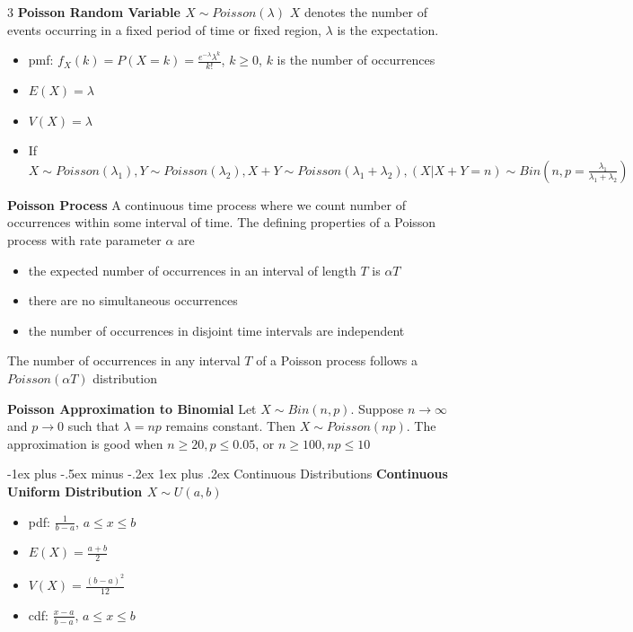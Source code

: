 \documentclass[10pt, landscape]{article}
\makeatletter
\renewcommand{\subsection}{\@startsection{subsection}{3}{0mm}%
                                {-1ex plus -.5ex minus -.2ex}%
                                {1ex plus .2ex}%
                                {\normalfont\small\bfseries}}%
\makeatother
\begin{document}
\begin{multicols*}{3}
\textbf{Poisson Random Variable $X \sim Poisson(\lambda)$} $X$ denotes the number of events occurring in a fixed period of time or fixed region, $\lambda$ is the expectation.
\begin{itemize}
    \item pmf: $f_X(k)=P(X=k)=\frac{e^{-\lambda}\lambda^k}{k!}$, $k \geq 0$, $k$ is the number of occurrences
    \item $E(X)=\lambda$
    \item $V(X)=\lambda$
    \item If $X \sim Poisson(\lambda_1), Y \sim Poisson(\lambda_2), X+Y \sim Poisson(\lambda_1+\lambda_2), (X | X+Y=n) \sim Bin(n, p=\frac{\lambda_1}{\lambda_1+\lambda_2})$
\end{itemize}

\textbf{Poisson Process} A continuous time process where we count number of occurrences within some interval of time. The defining properties of a Poisson process with rate parameter $\alpha$ are
\begin{itemize}
    \item the expected number of occurrences in an interval of length $T$ is $\alpha T$
    \item there are no simultaneous occurrences
    \item the number of occurrences in disjoint time intervals are independent
\end{itemize}
The number of occurrences in any interval $T$ of a Poisson process follows a $Poisson(\alpha T)$ distribution

\textbf{Poisson Approximation to Binomial} Let $X \sim Bin(n, p)$. Suppose $n \rightarrow \infty$ and $p \rightarrow 0$ such that $\lambda=np$ remains constant. Then $X \sim Poisson(np)$. The approximation is good when $n \geq 20, p \leq 0.05$, or $n \geq 100, np \leq 10$

\subsection{Continuous Distributions}
\textbf{Continuous Uniform Distribution $X\sim U(a, b)$}
\begin{itemize}
    \item pdf: $\frac{1}{b-a}$, $a \leq x \leq b$
    \item $E(X)=\frac{a+b}{2}$
    \item $V(X)=\frac{(b-a)^2}{12}$
    \item cdf: $\frac{x-a}{b-a}$, $a \leq x \leq b$
\end{itemize}


\end{multicols*}
\end{document}
